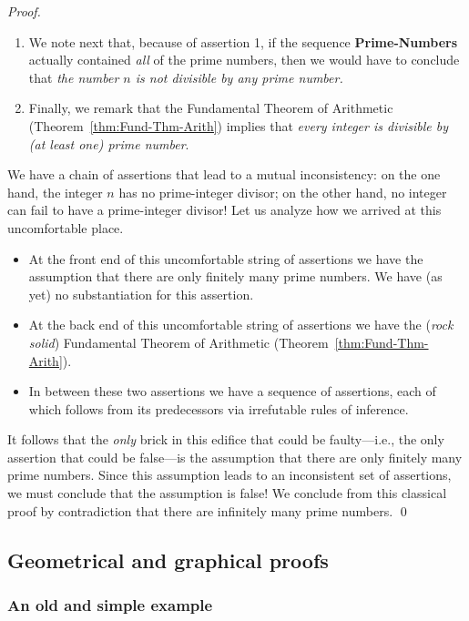 \begin{proof}
\begin{enumerate}
\item
We note next that, because of assertion 1, if the sequence {\bf
  Prime-Numbers} actually contained {\em all} of the prime numbers,
then we would have to conclude that {\em the number $n$ is not
  divisible by any prime number.}

\item
Finally, we remark that the Fundamental Theorem of Arithmetic
(Theorem~\ref{thm:Fund-Thm-Arith}) implies that {\em every integer is
  divisible by (at least one) prime number}.
\end{enumerate}

We have a chain of assertions that lead to a mutual inconsistency: on
the one hand, the integer $n$ has no prime-integer divisor; on the
other hand, no integer can fail to have a prime-integer divisor!  Let
us analyze how we arrived at this uncomfortable place.
\begin{itemize}
\item
At the front end of this uncomfortable string of assertions we have
the assumption that there are only finitely many prime numbers.  We
have (as yet) no substantiation for this assertion.
\item
At the back end of this uncomfortable string of assertions we have
the ({\em rock solid}) Fundamental Theorem of Arithmetic
(Theorem~\ref{thm:Fund-Thm-Arith}).
\item
In between these two assertions we have a sequence of assertions, each
of which follows from its predecessors via irrefutable rules of
inference.
\end{itemize}
It follows that the {\em only} brick in this edifice that could be
faulty---i.e., the only assertion that could be false---is the
assumption that there are only finitely many prime numbers.  Since
this assumption leads to an inconsistent set of assertions, we must
conclude that the assumption is false!  We conclude from this
classical proof by contradiction that there are infinitely many prime
numbers.  \qed
\end{proof}



\subsection{Geometrical and graphical proofs}
\label{sec:unconventionalproofs}

\subsubsection{An old and simple example}

